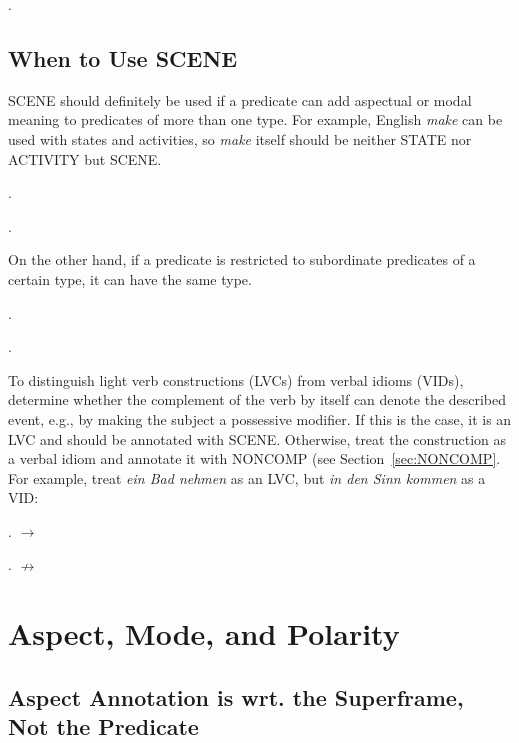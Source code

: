 \documentclass[a4paper]{article}
\newcommand{\fr}[1]{\textsf{#1}}
\begin{document}
\ex.


\newpage\subsection{When to Use \fr{SCENE}}

\fr{SCENE} should definitely be used if a predicate can add aspectual or modal
meaning to predicates of more than one type. For example, English \emph{make}
can be used with states and activities, so \emph{make} itself should be neither
\fr{STATE} nor \fr{ACTIVITY} but \fr{SCENE}.

\ex.

\ex.

On the other hand, if a predicate is restricted to subordinate predicates of a
certain type, it can have the same type.

\ex.

\ex.

To distinguish light verb constructions (LVCs) from verbal idioms (VIDs),
determine whether the complement of the verb by itself can denote the described
event, e.g., by making the subject a possessive modifier. If this is the case,
it is an LVC and should be annotated with \fr{SCENE}. Otherwise, treat the
construction as a verbal idiom and annotate it with \fr{NONCOMP} (see
Section~\ref{sec:NONCOMP}. For example, treat \emph{ein Bad nehmen} as an LVC,
but \emph{in den Sinn kommen} as a VID:

\ex. $\rightarrow$ 

\ex. $\nrightarrow$ 


\newpage\section{Aspect, Mode, and Polarity}

\subsection{Aspect Annotation is wrt. the Superframe, Not the Predicate}
\end{document}

